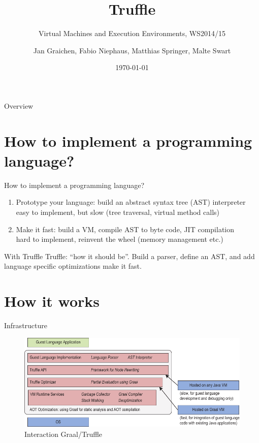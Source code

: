 \documentclass[xcolor=dvipsname]{beamer}
\title{Truffle}
\subtitle{Virtual Machines and Execution Environments, WS2014/15}
\author{Jan Graichen, Fabio Niephaus, Matthias Springer, Malte Swart}
\date{\today}
\institute[2012]{Hasso Plattner Institute, Software Architecture Group}
\begin{document}
\begin{frame}[plain]
	\maketitle
\end{frame}
\begin{frame}{Overview}
	\tableofcontents[hideallsubsections]
\end{frame}

\section{How to implement a programming language?}

\begin{frame}{How to implement a programming language?}
    \begin{enumerate}
        \item Prototype your language: build an abstract syntax tree (AST) interpreter \\
        easy to implement, but slow (tree traversal, virtual method calls)
        \item Make it fast: build a VM, compile AST to byte code, JIT compilation \\
        hard to implement, reinvent the wheel (memory management etc.)
    \end{enumerate}

    \vfill
    \begin{alertblock}{With Truffle}
        Truffle: ``how it should be''. Build a parser, define an AST, and add language specific optimizations make it fast.
    \end{alertblock}
\end{frame}


\section{How it works}

\begin{frame}{Infrastructure}
	\begin{figure}
        \includegraphics[width=\textwidth]{infrastructure.pdf}
        \caption{Interaction Graal/Truffle}
        \label{fig:interaction}
    \end{figure}
\end{frame}
\end{document}
